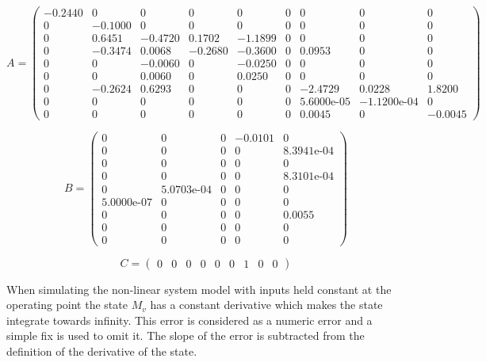 \begin{equation}  \label{eq:A}
	A = \left(\begin{array}{ccccccccc}
		-0.2440 & 0 & 0 & 0 & 0 & 0 & 0 & 0 & 0\\
		0 & -0.1000 & 0 & 0 & 0 & 0 & 0 & 0 & 0\\
		0 & 0.6451 & -0.4720 & 0.1702 & -1.1899 & 0 & 0 & 0 & 0\\
		0 & -0.3474 & 0.0068 & -0.2680 & -0.3600 & 0 & 0.0953 & 0 & 0\\
		0 & 0 & -0.0060 & 0 & -0.0250 & 0 & 0 & 0 & 0\\
		0 & 0 & 0.0060 & 0 & 0.0250 & 0 & 0 & 0 & 0\\
		0 & -0.2624 & 0.6293 & 0 & 0 & 0 & -2.4729 & 0.0228 & 1.8200\\
		0 & 0 & 0 & 0 & 0 & 0 & \text{5.6000e-05} & -\text{1.1200e-04} & 0\\
		0 & 0 & 0 & 0 & 0 & 0 & 0.0045 & 0 & -0.0045
	\end{array}\right)
\end{equation}

\begin{equation}  \label{eq:B}
	B = \left(\begin{array}{ccccc}
		0 & 0 & 0 & -0.0101 & 0\\
		0 & 0 & 0 & 0 & \text{8.3941e-04}\\
		0 & 0 & 0 & 0 & 0\\
		0 & 0 & 0 & 0 & \text{8.3101e-04}\\
		0 & \text{5.0703e-04} & 0 & 0 & 0\\
		\text{5.0000e-07} & 0 & 0 & 0 & 0\\
		0 & 0 & 0 & 0 & 0.0055\\
		0 & 0 & 0 & 0 & 0\\
		0 & 0 & 0 & 0 & 0
	\end{array}\right)
\end{equation}

\begin{equation}  \label{eq:C}
	C =\left(\begin{array}{ccccccccc}
		0 & 0 & 0 & 0 & 0 & 0 & 1 & 0 & 0
	\end{array}\right)
\end{equation}

When simulating the non-linear system model with inputs held constant at the operating point the state $M_v$ has a constant derivative which makes the state integrate towards infinity. This error is considered as a numeric error and a simple fix is used to omit it. The slope of the error is subtracted from the definition of the derivative of the state.



